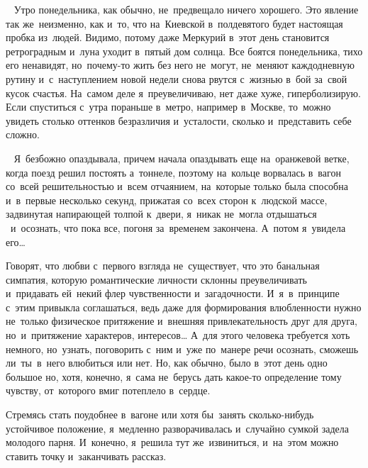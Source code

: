 
~
Утро понедельника, как обычно, не~предвещало ничего хорошего.
Это явление так же~неизменно, как и~то, что на~Киевской в~полдевятого будет настоящая пробка из~людей.
Видимо, потому даже Меркурий в~этот день становится ретроградным и~луна уходит в~пятый дом солнца.
Все боятся понедельника, тихо его ненавидят, но~почему-то жить без него не~могут, не~меняют каждодневную рутину и~с~наступлением новой недели снова рвутся с~жизнью в~бой за~свой кусок счастья.
На~самом деле я~преувеличиваю, нет даже хуже, гиперболизирую.
Если спуститься с~утра пораньше в~метро, например в~Москве, то~можно увидеть столько оттенков безразличия и~усталости, сколько и~представить себе сложно.

~
Я~безбожно опаздывала, причем начала опаздывать еще на~оранжевой ветке, когда поезд решил постоять а~тоннеле, поэтому на~кольце ворвалась в~вагон со~всей решительностью и~всем отчаянием, на~которые только была способна и~в~первые несколько секунд, прижатая со~всех сторон к~людской массе, задвинутая напирающей толпой к~двери, я~никак не~могла отдышаться ~и~осознать, что пока все, погоня за~временем закончена.
А~потом я~увидела его…
 
Говорят, что любви с~первого взгляда не~существует, что это банальная симпатия, которую романтические личности склонны преувеличивать и~придавать ей~некий флер чувственности и~загадочности.
И~я~в~принципе с~этим привыкла соглашаться, ведь даже для формирования влюбленности нужно не~только физическое притяжение и~внешняя привлекательность друг для друга, но~и~притяжение характеров, интересов… А~для этого человека требуется хоть немного, но~узнать, поговорить с~ним и~уже по~манере речи осознать, сможешь ли~ты~в~него влюбиться или нет.
Но, как обычно, было в~этот день одно большое но, хотя, конечно, я~сама не~берусь дать какое-то определение тому чувству, от~которого вмиг потеплело в~сердце.
 
Стремясь стать поудобнее в~вагоне или хотя бы~занять сколько-нибудь устойчивое положение, я~медленно разворачивалась и~случайно сумкой задела молодого парня.
И~конечно, я~решила тут же~извиниться, и~на~этом можно ставить точку и~заканчивать рассказ.
 
